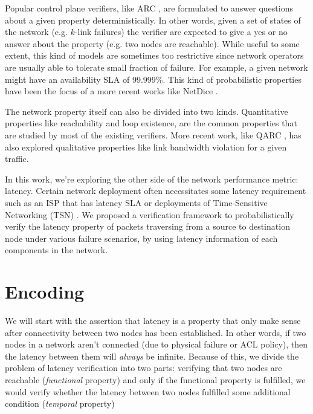 \documentclass[10pt,sigconf,letterpaper,anonymous,nonacm]{acmart}
\begin{document}
Popular control plane verifiers, like ARC \cite{gember2016fast}, are formulated to answer 
questions about a given property deterministically. 
In other words, given a set of states of the network (e.g. $k$-link failures) the verifier are 
expected to give a yes or no answer about the property (e.g. two nodes are reachable).
While useful to some extent, this kind of models are sometimes too restrictive since network 
operators are usually able to tolerate small fraction of failure. 
For example, a given network might have an availability SLA of 99.999\%. 
This kind of probabilistic properties have been the focus of a more recent works like NetDice 
\cite{steffen2020probabilistic}.

The network property itself can also be divided into two kinds. 
Quantitative properties like reachability and loop existence, are the common properties that are 
studied by most of the existing verifiers. 
More recent work, like QARC \cite{subramanian2020detecting}, has also explored qualitative 
properties like link bandwidth violation for a given traffic.

In this work, we're exploring the other side of the network performance metric: latency. 
Certain network deployment often necessitates some latency requirement such as an ISP that has 
latency SLA \cite{Verizon} or deployments of Time-Sensitive Networking (TSN) \cite{TSN}.
We proposed a verification framework to probabilistically verify the latency property of packets 
traversing from a source to destination node under various failure scenarios, by using latency 
information of each components in the network.



\section{Encoding}
We will start with the assertion that latency is a property that only make sense 
after connectivity between two nodes has been established. 
In other words, if two nodes in a network aren't connected (due to physical failure 
or ACL policy), then the latency between them will \textit{always} be infinite.
Because of this, we divide the problem of latency verification into two parts: 
verifying that two nodes are reachable (\textit{functional} property) and only if 
the functional property is fulfilled, we would verify whether the latency between 
two nodes fulfilled some additional condition (\textit{temporal} property)
\end{document}

